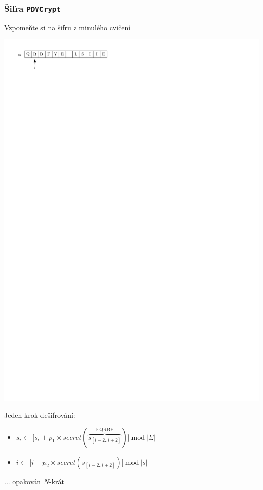 \documentclass[usenames,dvipsnames,9pt]{beamer}
\begin{document}
{
\begin{frame}[fragile]
  \frametitle{Šifra \texttt{PDVCrypt}}
  Vzpomeňte si na šifru z minulého cvičení
  \begin{center}
    \includegraphics[scale=0.8]{02/figs/pdvcrypt.pdf}
  \end{center}

  {\small
  Jeden krok dešifrování:
  \vspace{-1em}
  \begin{itemize}
    \item $s_i \gets \Big[ s_i + p_1 \times secret(\overbrace{s_{[i-2 .. i+2]}}^{\text{EQRBF}}) \Big] \ \mathrm{mod}\ |\Sigma|$
    \item $i \gets \Big[ i + p_2 \times secret(s_{[i-2 .. i+2]}) \Big] \ \mathrm{mod} \ |s|$
  \end{itemize}
  ... opakován $N$-krát}

  \vspace{1em}
\end{frame}
}
\end{document}
